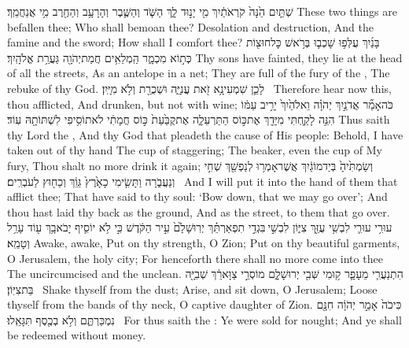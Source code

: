 {שְׁתַּ֤יִם הֵ֙נָּה֙ קֹרְאֹתַ֔יִךְ מִ֖י יָנ֣וּד לָ֑ךְ הַשֹּׁ֧ד וְהַשֶּׁ֛בֶר וְהָרָעָ֥ב וְהַחֶ֖רֶב מִ֥י אֲנַחֲמֵֽךְ׃}
{These two things are befallen thee; Who shall bemoan thee? Desolation and destruction, And the famine and the sword; How shall I comfort thee?}
{בָּנַ֜יִךְ עֻלְּפ֥וּ שָׁכְב֛וּ בְּרֹ֥אשׁ כׇּל\maqqaf חוּצ֖וֹת כְּת֣וֹא מִכְמָ֑ר הַֽמְלֵאִ֥ים חֲמַת\maqqaf יְהֹוָ֖ה גַּעֲרַ֥ת אֱלֹהָֽיִךְ׃}
{Thy sons have fainted, they lie at the head of all the streets, As an antelope in a net; They are full of the fury of the \lord, The rebuke of thy God.}
{לָכֵ֛ן שִׁמְעִי\maqqaf נָ֥א זֹ֖את עֲנִיָּ֑ה וּשְׁכֻרַ֖ת וְלֹ֥א מִיָּֽיִן׃ \petucha }
{Therefore hear now this, thou afflicted, And drunken, but not with wine;}
{כֹּה\maqqaf אָמַ֞ר אֲדֹנַ֣יִךְ יְהֹוָ֗ה וֵאלֹהַ֙יִךְ֙ יָרִ֣יב עַמּ֔וֹ הִנֵּ֥ה לָקַ֛חְתִּי מִיָּדֵ֖ךְ אֶת\maqqaf כּ֣וֹס הַתַּרְעֵלָ֑ה אֶת\maqqaf קֻבַּ֙עַת֙ כּ֣וֹס חֲמָתִ֔י לֹא\maqqaf תוֹסִ֥יפִי לִשְׁתּוֹתָ֖הּ עֽוֹד׃}
{Thus saith thy Lord the \lord, And thy God that pleadeth the cause of His people: Behold, I have taken out of thy hand The cup of staggering; The beaker, even the cup of My fury, Thou shalt no more drink it again;}
{וְשַׂמְתִּ֙יהָ֙ בְּיַד\maqqaf מוֹגַ֔יִךְ אֲשֶׁר\maqqaf אָמְר֥וּ לְנַפְשֵׁ֖ךְ שְׁחִ֣י וְנַעֲבֹ֑רָה וַתָּשִׂ֤ימִי כָאָ֙רֶץ֙ גֵּוֵ֔ךְ וְכַח֖וּץ לַעֹבְרִֽים׃ \petucha }
{And I will put it into the hand of them that afflict thee; That have said to thy soul: ‘Bow down, that we may go over’; And thou hast laid thy back as the ground, And as the street, to them that go over.}
\newperek
{}
{עוּרִ֥י עוּרִ֛י לִבְשִׁ֥י עֻזֵּ֖ךְ צִיּ֑וֹן לִבְשִׁ֣י \legarmeh  בִּגְדֵ֣י תִפְאַרְתֵּ֗ךְ יְרֽוּשָׁלַ֙͏ִם֙ עִ֣יר הַקֹּ֔דֶשׁ כִּ֣י לֹ֥א יוֹסִ֛יף יָבֹא\maqqaf בָ֥ךְ ע֖וֹד עָרֵ֥ל וְטָמֵֽא׃}
{Awake, awake, Put on thy strength, O Zion; Put on thy beautiful garments, O Jerusalem, the holy city; For henceforth there shall no more come into thee The uncircumcised and the unclean.}
{הִתְנַעֲרִ֧י מֵעָפָ֛ר ק֥וּמִי שְּׁבִ֖י יְרוּשָׁלָ֑͏ִם  מוֹסְרֵ֣י צַוָּארֵ֔ךְ שְׁבִיָּ֖ה בַּת\maqqaf צִיּֽוֹן׃ \setuma }
{Shake thyself from the dust; Arise, and sit down, O Jerusalem; Loose thyself from the bands of thy neck, O captive daughter of Zion.}
{כִּי\maqqaf כֹה֙ אָמַ֣ר יְהֹוָ֔ה חִנָּ֖ם נִמְכַּרְתֶּ֑ם וְלֹ֥א בְכֶ֖סֶף תִּגָּאֵֽלוּ׃ \setuma }
{For thus saith the \lord: Ye were sold for nought; And ye shall be redeemed without money.}
